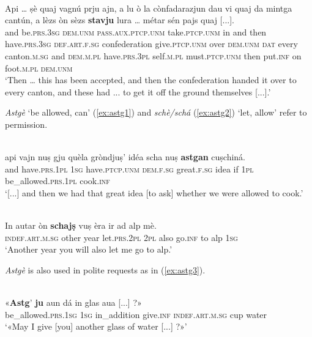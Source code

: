 \ea
\label{ex:stuaj2}
\\
\gll Api … ṣè quaj vagnú prju ajn, a lu ò la cònfadarazjun dau vi quaj da mintga cantún, a lèzs òn sèzs \textbf{stavju} lura … métar sén pajs quaj [...].\\
and {} be.\textsc{prs.3sg} \textsc{dem.unm} \textsc{pass.aux.ptcp.unm} take.\textsc{ptcp.unm} in and then have.\textsc{prs.3sg} \textsc{def.art.f.sg} confederation give.\textsc{ptcp.unm} over \textsc{dem.unm} \textsc{dat} every canton.\textsc{m.sg} and \textsc{dem.m.pl} have.\textsc{prs.3pl} self.\textsc{m.pl} must.\textsc{ptcp.unm} then {} put.\textsc{inf} on foot.\textsc{m.pl} \textsc{dem.unm}\\
\glt `Then … this has been accepted, and then the confederation handed it over to every canton, and these had ... to get it off the ground themselves [...].'
\z

\textit{Astgè} `be allowed, can' (\ref{ex:astg1}) and \textit{schè/schá} (\ref{ex:astg2}) `let, allow' refer to permission.

\ea
\label{ex:astg1}
\\
\gll[...] api vajn nuṣ gju quèla gròndjuṣ’ idéa scha nuṣ \textbf{astgan} cuṣchiná.\\
{} and have.\textsc{prs.1pl} \textsc{1sg} have.\textsc{ptcp.unm} \textsc{dem.f.sg} great.\textsc{f.sg} idea if \textsc{1pl} be\_allowed.\textsc{prs.1pl} cook.\textsc{inf}\\
\glt `[...] and then we had that great idea [to ask] whether we were allowed to cook.'
\z

\ea
\label{ex:astg2}
\\
\gll  In autar òn \textbf{schajṣ} vuṣ èra ir ad alp mè. \\
\textsc{indef.art.m.sg} other year let.\textsc{prs.2pl} \textsc{2pl} also go.\textsc{inf} to alp \textsc{1sg}\\
\glt `Another year you will also let me go to alp.'
\z

\textit{Astgè} is also used in polite requests as in  (\ref{ex:astg3}).

\ea
\label{ex:astg3}
\\
	\gll  «\textbf{Astg}’ \textbf{ju} aun dá in glas aua [...] ?»\\
be\_allowed.\textsc{prs.1sg} \textsc{1sg} in\_addition give.\textsc{inf} \textsc{indef.art.m.sg} cup water\\
\glt `«May I give [you] another glass of water [...] ?»'
\z


